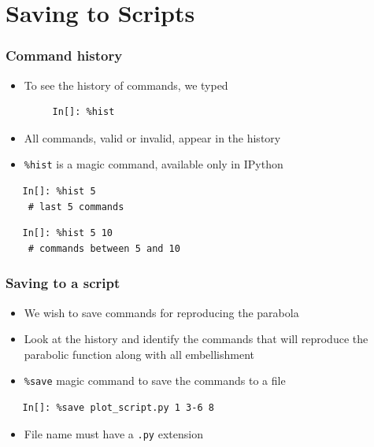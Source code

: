 \section{Saving to Scripts}

\begin{frame}[fragile]
  \frametitle{Command history}
  \begin{itemize}
  \item To see the history of commands, we typed
    \begin{lstlisting}
     In[]: %hist
    \end{lstlisting}
  \item All commands, valid or invalid, appear in the history
  \item \texttt{\%hist} is a magic command, available only in IPython
  \end{itemize}
  \begin{lstlisting}
   In[]: %hist 5
    # last 5 commands
  \end{lstlisting}
  \begin{lstlisting}
   In[]: %hist 5 10
    # commands between 5 and 10
  \end{lstlisting}
\end{frame}

\begin{frame}[fragile]
  \frametitle{Saving to a script}
  \begin{itemize}
  \item We wish to save commands for reproducing the parabola
  \item Look at the history and identify the commands that will
    reproduce the parabolic function along with all embellishment
  \item \texttt{\%save} magic command to save the commands to a file
  \end{itemize}
  \begin{lstlisting}
   In[]: %save plot_script.py 1 3-6 8
  \end{lstlisting}
  \begin{itemize}
  \item File name must have a \texttt{.py} extension
  \end{itemize}
\end{frame}

